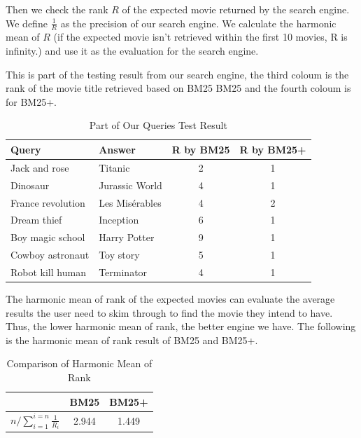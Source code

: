 \documentclass[sigconf,nonacm]{acmart}
\begin{document}
Then we check the rank $R$ of the expected movie returned by the search
engine.
We define $\frac{1}{R}$ as the precision of our search engine.
We calculate the harmonic mean of $R$ (if the expected movie isn’t retrieved
within the first 10 movies, R is infinity.) and use it as the evaluation for
the search engine.

This is part of the testing result from our search engine, the third coloum
is the rank of the movie title retrieved based on BM25 BM25 and the fourth
coloum is for BM25+.


\begin{table}[H]
  \caption{Part of Our Queries Test Result}
  \label{tab:query_result}
  \begin{tabular}{llcc}
    \toprule
    Query             & Answer         & R by BM25 & R by BM25+ \\
    \midrule
    Jack and rose     & Titanic        & 2         & 1          \\
    Dinosaur          & Jurassic World & 4         & 1          \\
    France revolution & Les Misérables & 4         & 2          \\
    Dream thief       & Inception      & 6         & 1          \\
    Boy magic school  & Harry Potter   & 9         & 1          \\
    Cowboy astronaut  & Toy story      & 5         & 1          \\
    Robot kill human  & Terminator     & 4         & 1          \\
    \bottomrule
  \end{tabular}
\end{table}

The harmonic mean of rank of the expected movies can evaluate the average
results the user need to skim through to find the movie they intend to have.
Thus, the lower harmonic mean of rank, the better engine we have.
The following is the harmonic mean of rank result of BM25 and BM25+.


\begin{table}[H]
  \caption{Comparison of Harmonic Mean of Rank }
  \begin{tabular}{ c  c c}
    \toprule
                                              & BM25  & BM25+ \\
    \midrule
    $ n / \sum_{i=1}^{i=n} \frac{1}{R_{i}}  $ & 2.944 & 1.449 \\
    \bottomrule
  \end{tabular}
\end{table}
\end{document}
